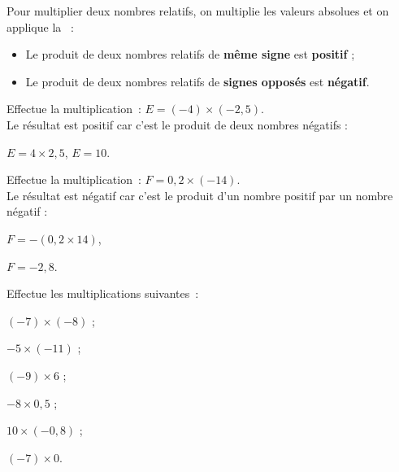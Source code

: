 

\begin{aconnaitre}
Pour multiplier deux nombres relatifs, on multiplie les valeurs absolues et on applique la  :
\begin{itemize}
 \item Le produit de deux nombres relatifs de \textbf{même signe} est \textbf{positif} ;
 \item Le produit de deux nombres relatifs de \textbf{signes opposés} est \textbf{négatif}.
 \end{itemize}
\end{aconnaitre}

\begin{methode*1}

 \begin{exemple*1}
Effectue la multiplication : $E = (-4) \times (-2,5)$. \\[0.5em]
Le résultat est positif car c'est le produit de deux nombres négatifs :

$E = 4 \times 2,5$, \hspace{3cm} $E = 10$.
 \end{exemple*1}

 \begin{exemple*1}
Effectue la multiplication : $F = 0,2 \times (-14)$. \\[0.5em]
Le résultat est négatif car c'est le produit d'un nombre positif par un nombre négatif :

$F = -(0,2 \times 14)$, \hspace{3cm}

$F = -2,8$.
 \end{exemple*1}

 \exercice  
Effectue les multiplications suivantes :
\vspace{1em}
\begin{colenumerate}{3}
 \item $(-7) \times (-8)$ \dotfill;
 \vspace{1em}
 \item $-5 \times (-11)$ \dotfill;
 \vspace{1em}
 \item $(-9) \times 6$ \dotfill;
 \vspace{1em}
 \item $-8 \times 0,5$ \dotfill;
 \vspace{1em}
 \item $10 \times (-0,8)$ \dotfill;
 \vspace{1em}
 \item $(-7) \times 0$\dotfill.
 \end{colenumerate}



 \end{methode*1}
 
